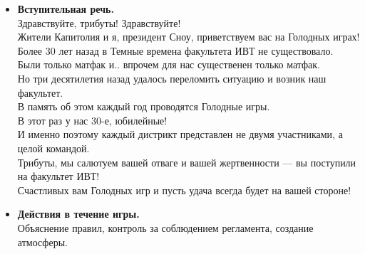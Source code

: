 
\begin{itemize}
\item \textbf{Вступительная речь.}\\
Здравствуйте, трибуты! Здравствуйте!\\
Жители Капитолия и я, президент Сноу, приветствуем вас на Голодных играх!\\
Более 30 лет назад в Темные времена факультета ИВТ не существовало.\\
Были только матфак и.. впрочем для нас существенен только матфак.\\
Но три десятилетия назад удалось переломить ситуацию и возник наш факультет.\\
В память об этом каждый год проводятся Голодные игры.\\
В этот раз у нас 30-е, юбилейные!\\
И именно поэтому каждый дистрикт представлен не двумя участниками, а целой командой.\\
Трибуты, мы салютуем вашей отваге и вашей жертвенности --- вы поступили на факультет ИВТ!\\
Счастливых вам Голодных игр и пусть удача всегда будет на вашей стороне!

\item \textbf{Действия в течение игры.}\\
Объяснение правил, контроль за соблюдением регламента, создание атмосферы.
\end{itemize}